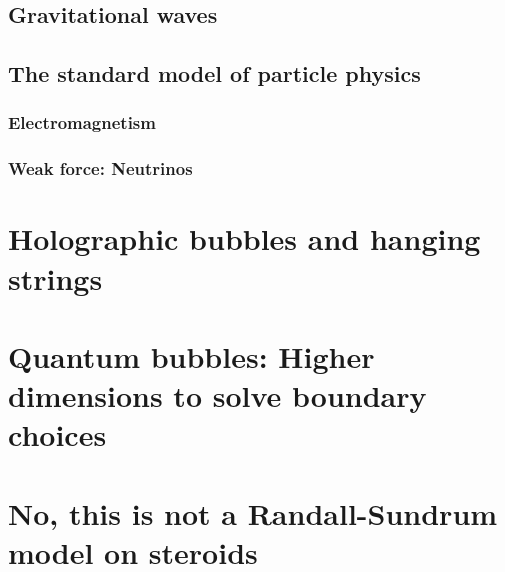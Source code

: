 \documentclass[12pt, a4paper]{article} %
\begin{document}
\subsection{Gravitational waves}
\subsection{The standard model of particle physics}
\subsubsection{Electromagnetism}
\subsubsection{Weak force: Neutrinos}
\section{Holographic bubbles and hanging strings}\label{sec: holography_gravity}
\section{Quantum bubbles: Higher dimensions to solve boundary choices}\label{sec: quantum_bubbles}
\section{No, this is not a Randall-Sundrum model on steroids}\label{sec: RS_model}

\cite{Danielsson:2018ztv}






\end{document}
